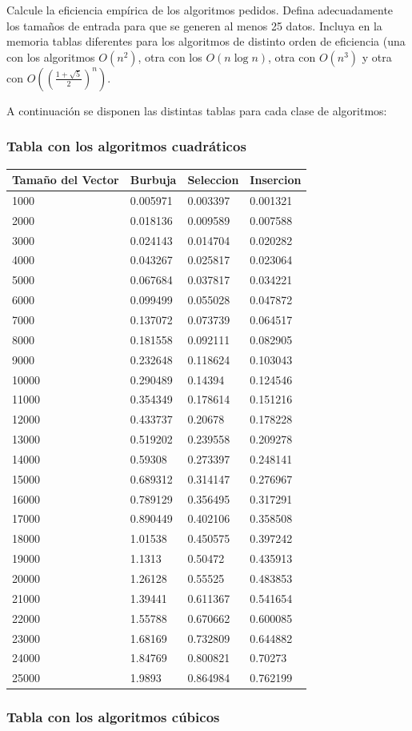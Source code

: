 \documentclass[]{article}
\begin{document}
Calcule la eficiencia empírica de los algoritmos pedidos. Defina
adecuadamente los tamaños de entrada para que se generen al menos 25
datos. Incluya en la memoria tablas diferentes para los algoritmos de
distinto orden de eficiencia (una con los algoritmos \(O(n^2)\), otra
con los \(O(n \log{n})\), otra con \(O(n^3)\) y otra con
\(O((\frac{1+\sqrt{5}}{2})^n)\).

A continuación se disponen las distintas tablas para cada clase de
algoritmos:

\subsubsection{Tabla con los algoritmos
cuadráticos}\label{tabla-con-los-algoritmos-cuadraticos}

\begin{longtable}[c]{@{}llll@{}}
\toprule
Tamaño del Vector & Burbuja & Seleccion & Insercion\tabularnewline
\midrule
\endhead
1000 & 0.005971 & 0.003397 & 0.001321\tabularnewline
2000 & 0.018136 & 0.009589 & 0.007588\tabularnewline
3000 & 0.024143 & 0.014704 & 0.020282\tabularnewline
4000 & 0.043267 & 0.025817 & 0.023064\tabularnewline
5000 & 0.067684 & 0.037817 & 0.034221\tabularnewline
6000 & 0.099499 & 0.055028 & 0.047872\tabularnewline
7000 & 0.137072 & 0.073739 & 0.064517\tabularnewline
8000 & 0.181558 & 0.092111 & 0.082905\tabularnewline
9000 & 0.232648 & 0.118624 & 0.103043\tabularnewline
10000 & 0.290489 & 0.14394 & 0.124546\tabularnewline
11000 & 0.354349 & 0.178614 & 0.151216\tabularnewline
12000 & 0.433737 & 0.20678 & 0.178228\tabularnewline
13000 & 0.519202 & 0.239558 & 0.209278\tabularnewline
14000 & 0.59308 & 0.273397 & 0.248141\tabularnewline
15000 & 0.689312 & 0.314147 & 0.276967\tabularnewline
16000 & 0.789129 & 0.356495 & 0.317291\tabularnewline
17000 & 0.890449 & 0.402106 & 0.358508\tabularnewline
18000 & 1.01538 & 0.450575 & 0.397242\tabularnewline
19000 & 1.1313 & 0.50472 & 0.435913\tabularnewline
20000 & 1.26128 & 0.55525 & 0.483853\tabularnewline
21000 & 1.39441 & 0.611367 & 0.541654\tabularnewline
22000 & 1.55788 & 0.670662 & 0.600085\tabularnewline
23000 & 1.68169 & 0.732809 & 0.644882\tabularnewline
24000 & 1.84769 & 0.800821 & 0.70273\tabularnewline
25000 & 1.9893 & 0.864984 & 0.762199\tabularnewline
\bottomrule
\end{longtable}

\subsubsection{Tabla con los algoritmos
cúbicos}\label{tabla-con-los-algoritmos-cubicos}
\end{document}
